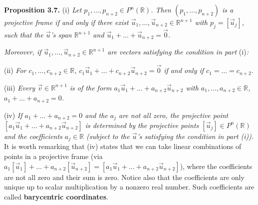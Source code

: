 \documentclass[leqno]{book}
\begin{document}
\noindent\textbf{Proposition 3.7.} (i) \emph{Let $p_1,\dots,p_{n+2}\in P^n(\mathbb R)$.  Then $(p_1,\dots,p_{n+2})$ is a projective frame if and only if there exist $\vec u_1,\dots,\vec u_{n+2}\in\mathbb R^{n+1}$ with $p_j=[\vec u_j]$, such that the $\vec u$'s span $\mathbb R^{n+1}$ and $\vec u_1+\dots+\vec u_{n+2}=\vec 0$.} %

\emph{Moreover, if $\vec u_1,\dots,\vec u_{n+2}\in\mathbb R^{n+1}$ are vectors satisfying the condition in part }(i)\emph{:}

(ii) \emph{For $c_1,\dots,c_{n+2}\in\mathbb R$, $c_1\vec u_1+\dots+c_{n+2}\vec u_{n+2}=\vec 0$ if and only if $c_1=\dots=c_{n+2}$.}

(iii) \emph{Every $\vec v\in\mathbb R^{n+1}$ is of the form $a_1\vec u_1+\dots+a_{n+2}\vec u_{n+2}$ with $a_1,\dots,a_{n+2}\in\mathbb R$, $a_1+\dots+a_{n+2}=0$.}

(iv) \emph{If $a_1+\dots+a_{n+2}=0$ and the $a_j$ are not all zero, the projective point $[a_1\vec u_1+\dots+a_{n+2}\vec u_{n+2}]$ is determined by the projective points $[\vec u_j]\in P^n(\mathbb R)$ and the coefficients $a_j\in\mathbb R$ (subject to the $\vec u$'s satisfying the condition in part (i)).}\\

\noindent It is worth remarking that (iv) states that we can take linear combinations of points in a projective frame (via $a_1[\vec u_1]+\dots+a_{n+2}[\vec u_{n+2}]=[a_1\vec u_1+\dots+a_{n+2}\vec u_{n+2}]$), where the coefficients are not all zero and their sum is zero.  Notice also that the coefficients are only unique up to scalar multiplication by a nonzero real number.  Such coefficients are called \textbf{barycentric coordinates}.
\end{document}
